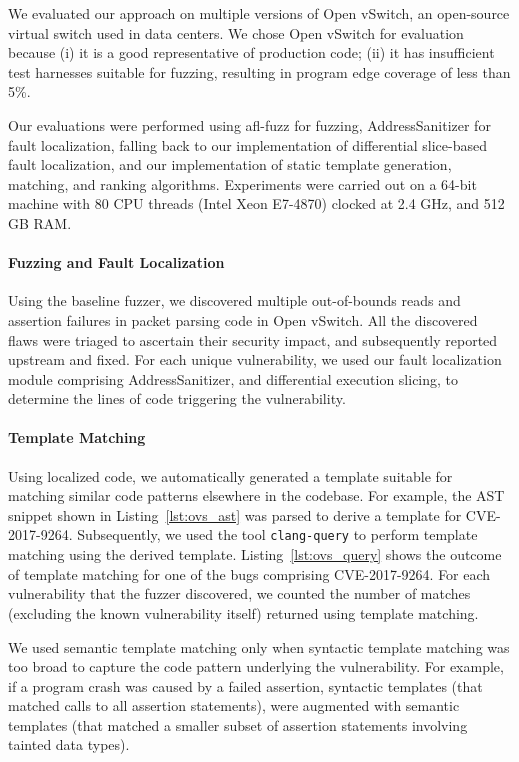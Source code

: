 We evaluated our approach on multiple versions of Open vSwitch, an open-source virtual switch used in data centers.
We chose Open vSwitch for evaluation because (i) it is a good representative of production code; (ii) it has insufficient test harnesses suitable for fuzzing, resulting in program edge coverage of less than 5\%.

Our evaluations were performed using afl-fuzz for fuzzing, AddressSanitizer for fault localization, falling back to our implementation of differential slice-based fault localization, and our implementation of static template generation, matching, and ranking algorithms.
Experiments were carried out on a 64-bit machine with 80 CPU threads (Intel Xeon E7-4870) clocked at 2.4 GHz, and 512 GB RAM.

\paragraph{Fuzzing and Fault Localization}
Using the baseline fuzzer, we discovered multiple out-of-bounds reads and assertion failures in packet parsing code in Open vSwitch.
All the discovered flaws were triaged to ascertain their security impact, and subsequently reported upstream and fixed.
For each unique vulnerability, we used our fault localization module comprising AddressSanitizer, and differential execution slicing, to determine the lines of code triggering the vulnerability.

\paragraph{Template Matching}
Using localized code, we automatically generated a template suitable for matching similar code patterns elsewhere in the codebase.
For example, the AST snippet shown in Listing~\ref{lst:ovs_ast} was parsed to derive a template for CVE-2017-9264.
Subsequently, we used the tool {\tt clang-query} to perform template matching using the derived template.
Listing~\ref{lst:ovs_query} shows the outcome of template matching for one of the bugs comprising CVE-2017-9264.
For each vulnerability that the fuzzer discovered, we counted the number of matches (excluding the known vulnerability itself) returned using template matching.

We used semantic template matching only when syntactic template matching was too broad to capture the code pattern underlying the vulnerability.
For example, if a program crash was caused by a failed assertion, syntactic templates (that matched calls to all assertion statements), were augmented with semantic templates (that matched a smaller subset of assertion statements involving tainted data types).

